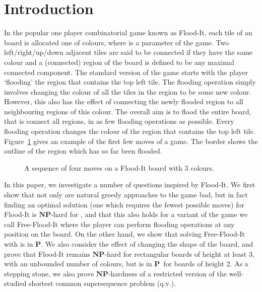 \documentclass[a4paper,11pt]{llncs}
\newcommand{\pgfgraphic}[1]{}
\newcounter{l}
\newcommand{\Ptime}{\ensuremath{\mathbf{P}}}
\newcommand{\NPtime}{\ensuremath{\mathbf{NP}}}
\newcommand{\recdim}[2]{}
\begin{document}
\section{Introduction} \label{sec:intro}
In the popular one player combinatorial game known as Flood-It, each tile of an \recdim{n}{n} board is allocated one of  colours, where  is a parameter of the game.  Two left/right/up/down adjacent tiles are said to be connected if they have the same colour and a (connected) region of the board is defined to be any maximal connected component.   The standard version of the game starts with the player `flooding' the region that contains the top left tile. The flooding operation simply involves changing the colour of all the tiles in the region to be some new colour. However, this also has the effect of connecting the newly flooded region to all neighbouring regions of this colour.    The overall aim is to flood the entire board, that is connect all regions, in as few flooding operations as possible. Every flooding operation changes the colour of the region that contains the top left tile.  Figure~\ref{fig:turns} gives an example of the first few moves of a game. The border shows the outline of the region which has so far been flooded.
\begin{figure}[t]
    \centering
	\pgfgraphic{graphic-turns} \caption{A sequence of four moves on a \recdim{6}{6} Flood-It board with 3 colours. }
    \label{fig:turns}
\end{figure}

In this paper, we investigate a number of questions inspired by Flood-It. We first show that not only are natural greedy approaches to the game bad, but in fact finding an optimal solution (one which requires the fewest possible moves) for Flood-It is \NPtime-hard for , and that this also holds for a variant of the game we call Free-Flood-It where the player can perform flooding operations at any position on the board. On the other hand, we show that solving Free-Flood-It with  is in \Ptime.  We also consider the effect of changing the shape of the board, and prove that Flood-It remains \NPtime-hard for rectangular boards of height at least 3, with an unbounded number of colours, but is in \Ptime\ for boards of height 2. As a stepping stone, we also prove \NPtime-hardness of a restricted version of the well-studied shortest common supersequence problem (q.v.).
\end{document}

